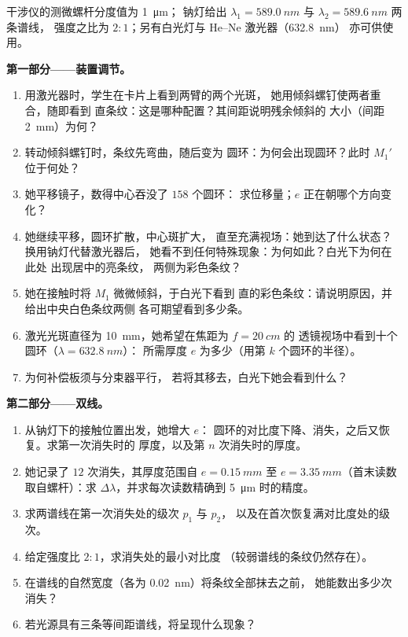 \begin{problem}
\label{pb:b2:michelson:1}

干涉仪的测微螺杆分度值为 \qty{1}{\micro m}；
钠灯给出 $\lambda_1 = \qty{589.0}{nm}$ 与 $\lambda_2 = \qty{589.6}{nm}$ 两条谱线，
强度之比为 $2 : 1$；另有白光灯与 He--Ne 激光器（\qty{632.8}{nm}）
亦可供使用。

\medskip
\noindent\textbf{第一部分——装置调节。}
\begin{enumerate}
  \item 用激光器时，学生在卡片上看到两臂的两个光斑，
        她用倾斜螺钉使两者重合，随即看到
        直条纹：这是哪种配置？其间距说明残余倾斜的
        大小（间距 \qty{2}{mm}）为何？
  \item 转动倾斜螺钉时，条纹先弯曲，随后变为
        圆环：为何会出现圆环？此时 $M_1'$ 位于何处？
  \item 她平移镜子，数得中心吞没了 $158$ 个圆环：
        求位移量；$e$ 正在朝哪个方向变化？
  \item 她继续平移，圆环扩散，中心斑扩大，
        直至充满视场：她到达了什么状态？换用钠灯代替激光器后，
        她看不到任何特殊现象：为何如此？白光下为何在此处
        出现居中的亮条纹，
        两侧为彩色条纹？
  \item 她在接触时将 $M_1$ 微微倾斜，于白光下看到
        直的彩色条纹：请说明原因，并给出中央白色条纹两侧
        各可期望看到多少条。
  \item 激光光斑直径为 \qty{10}{mm}，她希望在焦距为 $f = \qty{20}{cm}$ 的
        透镜视场中看到十个圆环（$\lambda = \qty{632.8}{nm}$）：
        所需厚度 $e$ 为多少（用第 $k$ 个圆环的半径）。
  \item 为何补偿板须与分束器平行，
        若将其移去，白光下她会看到什么？
\end{enumerate}

\medskip
\noindent\textbf{第二部分——双线。}
\begin{enumerate}[resume]
  \item 从钠灯下的接触位置出发，她增大 $e$：
        圆环的对比度下降、消失，之后又恢复。求第一次消失时的
        厚度，以及第 $n$ 次消失时的厚度。
  \item 她记录了 $12$ 次消失，其厚度范围自 $e = \qty{0.15}{mm}$ 至
        $e = \qty{3.35}{mm}$（首末读数取自螺杆）：求
        $\Delta\lambda$，并求每次读数精确到 \qty{5}{\micro m} 时的精度。
  \item 求两谱线在第一次消失处的级次 $p_1$ 与 $p_2$，
        以及在首次恢复满对比度处的级次。
  \item 给定强度比 $2 : 1$，求消失处的最小对比度
        （较弱谱线的条纹仍然存在）。
  \item 在谱线的自然宽度（各为 \qty{0.02}{nm}）将条纹全部抹去之前，
        她能数出多少次消失？
  \item 若光源具有三条等间距谱线，将呈现什么现象？
\end{enumerate}


\end{problem}
